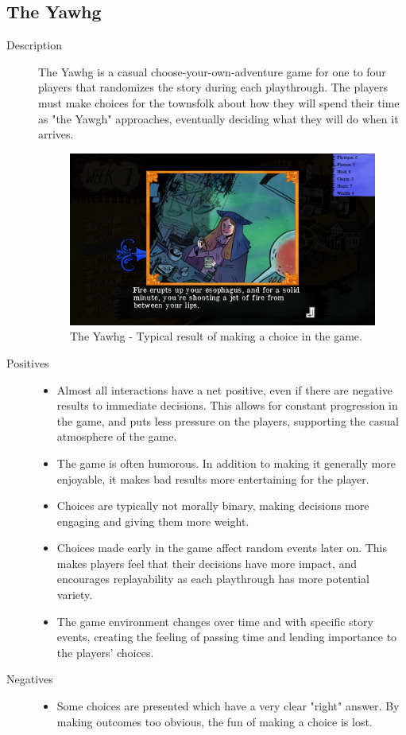 \subsection{The Yawhg}
\begin{description}
\item[Description]{The Yawhg is a casual choose-your-own-adventure game for one to four players that randomizes the story during each playthrough. The players must make choices for the townsfolk about how they will spend their time as "the Yawgh" approaches, eventually deciding what they will do when it arrives.

\begin{figure}[htb]
	\centering\includegraphics[width=.25\linewidth]{images/game_yawhg}
	\caption{The Yawhg - Typical result of making a choice in the game.}
	\label{fig:yawgh}
\end{figure}}
\item[Positives]{
\begin{itemize}
  \item {Almost all interactions have a net positive, even if there are negative results to immediate decisions. This allows for constant progression in the game, and puts less pressure on the players, supporting the casual atmosphere of the game.} 
  \item {The game is often humorous. In addition to making it generally more enjoyable, it makes bad results more entertaining for the player.}
  \item {Choices are typically not morally binary, making decisions more engaging and giving them more weight.}
  \item {Choices made early in the game affect random events later on. This makes players feel that their decisions have more impact, and encourages replayability as each playthrough has more potential variety.}
  \item {The game environment changes over time and with specific story events, creating the feeling of passing time and lending importance to the players' choices.}
\end{itemize}
}
\item[Negatives]{
\begin{itemize}
  \item {Some choices are presented which have a very clear "right" answer. By making outcomes too obvious, the fun of making a choice is lost.}

\end{itemize}}
\end{description}
